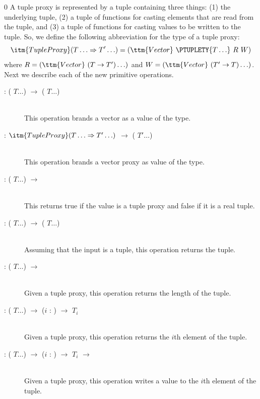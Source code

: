 \documentclass[7x10]{TimesAPriori_MIT}%
\def\racketEd{0}
\providecommand{\BookEdition}{1}
\let\edition\BookEdition
\numberwithin{theorem}{chapter}
\numberwithin{definition}{chapter}
\numberwithin{equation}{chapter}
\begin{document}
{\if\edition\racketEd    
A tuple proxy is represented by a tuple containing three things: (1) the
underlying tuple, (2) a tuple of functions for casting elements that
are read from the tuple, and (3) a tuple of functions for casting
values to be written to the tuple. So, we define the following
abbreviation for the type of a tuple proxy:
\[
\itm{TupleProxy} (T\ldots \Rightarrow T'\ldots)
= (\ttm{Vector}~\PTUPLETY{T\ldots} ~R~ W)
\]
where $R = (\ttm{Vector}~(T\to T') \ldots)$ and
$W = (\ttm{Vector}~(T'\to T) \ldots)$.
%
Next we describe each of the new primitive operations.

\begin{description}
\item[ : ( $T \ldots$) $\to$
  ( $T \ldots$)]\ \\
%
  This operation brands a vector as a value of the  type.
\item[ : $\itm{TupleProxy}(T\ldots \Rightarrow T'\ldots)$
  $\to$ ( $T' \ldots$)]\ \\
%
  This operation brands a vector proxy as value of the  type.
\item[ : ( $T \ldots$) $\to$
  \BOOLTY{}] \ \\
%
  This returns true if the value is a tuple proxy and false if it is a
  real tuple.
\item[ : ( $T \ldots$) $\to$
  ( $T \ldots$)]\ \\
%
  Assuming that the input is a tuple, this operation returns the
  tuple.
  
\item[ : ( $T \ldots$)
  $\to$ \INTTY{}]\ \\
%
  Given a tuple proxy, this operation returns the length of the tuple.
  
\item[ : ( $T \ldots$)
  $\to$ ($i$ : \INTTY{}) $\to$ $T_i$]\ \\
%
  Given a tuple proxy, this operation returns the $i$th element of the
  tuple.
  
\item[ : ( $T \ldots$) $\to$ ($i$
  : \INTTY{}) $\to$ $T_i$ $\to$ ]\ \\
  Given a tuple proxy, this operation writes a value to the $i$th element
  of the tuple.
\end{description}
\fi}
\end{document}
